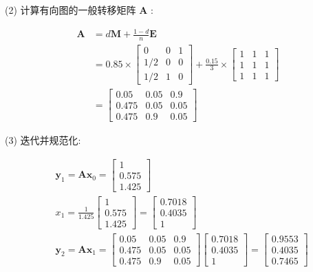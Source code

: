 \documentclass[10pt]{article}
\begin{document}
\begin{CJK*}{UTF8}{bsmi}
(2) 计算有向图的一般转移矩阵 $\boldsymbol{A}$ :

$$
\begin{aligned}
\boldsymbol{A} & =d \boldsymbol{M}+\frac{1-d}{n} \boldsymbol{E} \\
& =0.85 \times\left[\begin{array}{ccc}
0 & 0 & 1 \\
1 / 2 & 0 & 0 \\
1 / 2 & 1 & 0
\end{array}\right]+\frac{0.15}{3} \times\left[\begin{array}{ccc}
1 & 1 & 1 \\
1 & 1 & 1 \\
1 & 1 & 1
\end{array}\right] \\
& =\left[\begin{array}{lll}
0.05 & 0.05 & 0.9 \\
0.475 & 0.05 & 0.05 \\
0.475 & 0.9 & 0.05
\end{array}\right]
\end{aligned}
$$

(3) 迭代并规范化:

$$
\begin{aligned}
& \boldsymbol{y}_{1}=\boldsymbol{A} \boldsymbol{x}_{0}=\left[\begin{array}{l}
1 \\
0.575 \\
1.425
\end{array}\right] \\
& x_{1}=\frac{1}{1.425}\left[\begin{array}{l}
1 \\
0.575 \\
1.425
\end{array}\right]=\left[\begin{array}{l}
0.7018 \\
0.4035 \\
1
\end{array}\right] \\
& \boldsymbol{y}_{2}=\boldsymbol{A} \boldsymbol{x}_{1}=\left[\begin{array}{lll}
0.05 & 0.05 & 0.9 \\
0.475 & 0.05 & 0.05 \\
0.475 & 0.9 & 0.05
\end{array}\right]\left[\begin{array}{l}
0.7018 \\
0.4035 \\
1
\end{array}\right]=\left[\begin{array}{l}
0.9553 \\
0.4035 \\
0.7465
\end{array}\right]
\end{aligned}
$$


\end{CJK*}
\end{document}
